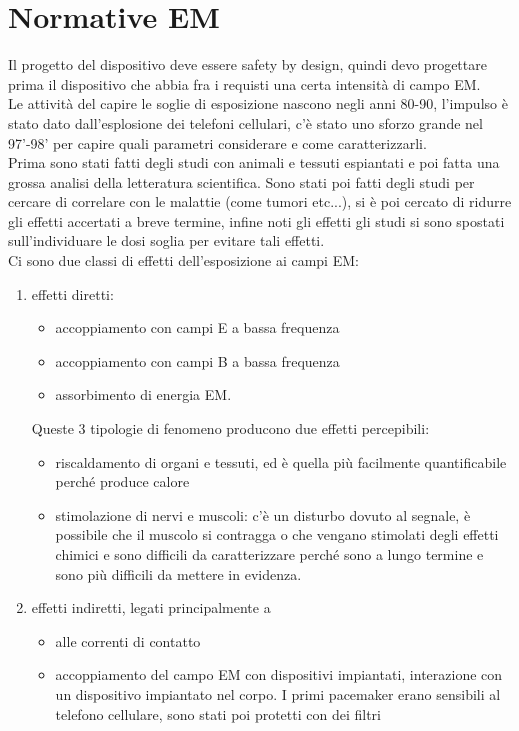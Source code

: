\documentclass[oneside, 12pt]{extbook}
\begin{document}
\section{Normative EM}
Il progetto del dispositivo deve essere safety by design, quindi devo progettare prima il dispositivo che abbia fra i requisti una certa intensità di campo EM.\\Le attività del capire le soglie di esposizione nascono negli anni 80-90, l'impulso è stato dato dall'esplosione dei telefoni cellulari, c'è stato uno sforzo grande nel 97'-98' per capire quali parametri considerare e come caratterizzarli.\\Prima sono stati fatti degli studi con animali e tessuti espiantati e poi fatta una grossa analisi della letteratura scientifica. Sono stati poi fatti degli studi per cercare di correlare con le malattie (come tumori etc...), si è poi cercato di ridurre gli effetti accertati a breve termine, infine noti gli effetti gli studi si sono spostati sull'individuare le dosi soglia per evitare tali effetti.\\Ci sono due classi di effetti dell'esposizione ai campi EM:
\begin{enumerate}
	\item effetti diretti:
	\begin{itemize}
		\item accoppiamento con campi E a bassa frequenza
		\item accoppiamento con campi B a bassa frequenza
		\item assorbimento di energia EM.
	\end{itemize}
	Queste 3 tipologie di fenomeno producono due effetti percepibili:
	\begin{itemize}
		\item riscaldamento di organi e tessuti, ed è quella più facilmente quantificabile perché produce calore
		\item stimolazione di nervi e muscoli: c'è un disturbo dovuto al segnale, è possibile che il muscolo si contragga o che vengano stimolati degli effetti chimici e sono difficili da caratterizzare perché sono a lungo termine e sono più difficili da mettere in evidenza.
	\end{itemize}
	\item effetti indiretti, legati principalmente a
	\begin{itemize}
		\item alle correnti di contatto
		\item accoppiamento del campo EM con dispositivi impiantati, interazione con un dispositivo impiantato nel corpo. I primi pacemaker erano sensibili al telefono cellulare, sono stati poi protetti con dei filtri
	\end{itemize}
\end{enumerate}
\end{document}
